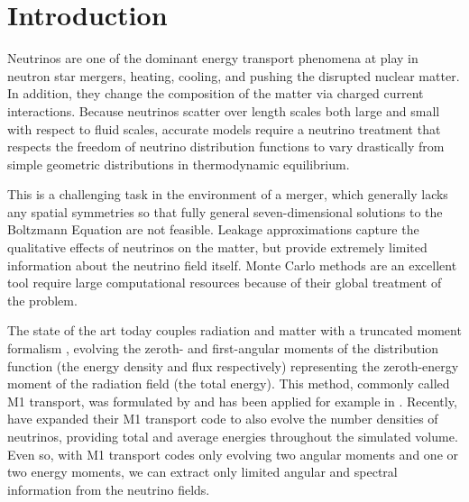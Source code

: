 \documentclass[aps,floatfix,prd,superscriptaddress,twocolumn]{revtex4-1}
\newcommand{\todo}[1]{\marginpar{\tiny{\textcolor{red}{#1}}}}
\begin{document}
\maketitle

\section{Introduction}
Neutrinos are one of the dominant energy transport phenomena at play in
neutron star mergers, heating, cooling, and pushing the disrupted nuclear
matter.
In addition, they change the composition of the matter via charged current
interactions.
Because neutrinos scatter over length scales both large and small with
respect to fluid scales, accurate models require a neutrino treatment that
respects the freedom of neutrino distribution functions to vary
drastically from simple geometric distributions in thermodynamic equilibrium.

This is a challenging task in the environment of a merger,
which generally lacks any spatial symmetries so that fully general
seven-dimensional solutions to the Boltzmann Equation are not feasible.
Leakage approximations
\citep{deat2013-leakage, pere2016-asl, radi2016-dynamical}
\todo{cite others}
capture the qualitative effects of neutrinos on the matter, but
provide extremely limited information about the neutrino field itself.
\todo{discuss mc more clearly}
Monte Carlo methods \citep{abdi2012-monte_carlo, rich2015-monte_carlo}
are an excellent tool require large computational resources because of
their global treatment of the problem.

The state of the art today couples radiation and matter with a truncated
moment formalism
\citep{shib2011-truncated_moment, fouc2015-m1_nsbh, fouc2016-m1_nsns,
  just2015-m1_code},
\todo{cite others}
evolving the zeroth- and first-angular moments of the distribution function
(the energy density and flux respectively) representing the zeroth-energy moment
of the radiation field (the total energy).
This method, commonly called M1 transport, was formulated by
\cite{thor1981-truncated_moment, shib2011-truncated_moment}
and has been applied for example in \cite{ramp2002-truncated_moment,
  card2013-truncated_moment, fouc2015-m1_nsbh, ocon2015-gr1d_with_nu}.
Recently, \cite{fouc2016-m1_evolve_n} have expanded their M1 transport code
to also evolve the number densities of neutrinos,
providing total and average energies throughout the simulated volume.
Even so, with M1 transport codes only evolving two angular moments
and one or two energy moments,
we can extract only limited angular and spectral information
from the neutrino fields.
\end{document}
